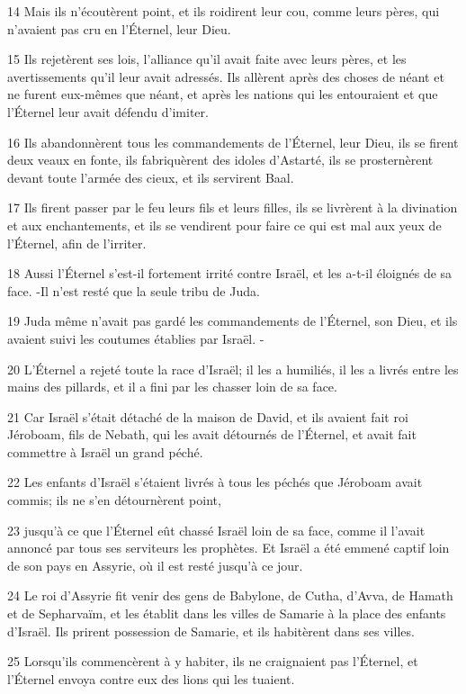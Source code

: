 \par 14 Mais ils n'écoutèrent point, et ils roidirent leur cou, comme leurs pères, qui n'avaient pas cru en l'Éternel, leur Dieu.
\par 15 Ils rejetèrent ses lois, l'alliance qu'il avait faite avec leurs pères, et les avertissements qu'il leur avait adressés. Ils allèrent après des choses de néant et ne furent eux-mêmes que néant, et après les nations qui les entouraient et que l'Éternel leur avait défendu d'imiter.
\par 16 Ils abandonnèrent tous les commandements de l'Éternel, leur Dieu, ils se firent deux veaux en fonte, ils fabriquèrent des idoles d'Astarté, ils se prosternèrent devant toute l'armée des cieux, et ils servirent Baal.
\par 17 Ils firent passer par le feu leurs fils et leurs filles, ils se livrèrent à la divination et aux enchantements, et ils se vendirent pour faire ce qui est mal aux yeux de l'Éternel, afin de l'irriter.
\par 18 Aussi l'Éternel s'est-il fortement irrité contre Israël, et les a-t-il éloignés de sa face. -Il n'est resté que la seule tribu de Juda.
\par 19 Juda même n'avait pas gardé les commandements de l'Éternel, son Dieu, et ils avaient suivi les coutumes établies par Israël. -
\par 20 L'Éternel a rejeté toute la race d'Israël; il les a humiliés, il les a livrés entre les mains des pillards, et il a fini par les chasser loin de sa face.
\par 21 Car Israël s'était détaché de la maison de David, et ils avaient fait roi Jéroboam, fils de Nebath, qui les avait détournés de l'Éternel, et avait fait commettre à Israël un grand péché.
\par 22 Les enfants d'Israël s'étaient livrés à tous les péchés que Jéroboam avait commis; ils ne s'en détournèrent point,
\par 23 jusqu'à ce que l'Éternel eût chassé Israël loin de sa face, comme il l'avait annoncé par tous ses serviteurs les prophètes. Et Israël a été emmené captif loin de son pays en Assyrie, où il est resté jusqu'à ce jour.
\par 24 Le roi d'Assyrie fit venir des gens de Babylone, de Cutha, d'Avva, de Hamath et de Sepharvaïm, et les établit dans les villes de Samarie à la place des enfants d'Israël. Ils prirent possession de Samarie, et ils habitèrent dans ses villes.
\par 25 Lorsqu'ils commencèrent à y habiter, ils ne craignaient pas l'Éternel, et l'Éternel envoya contre eux des lions qui les tuaient.
